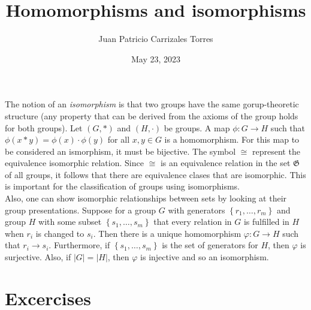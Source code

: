 \documentclass[12pt]{article}
\begin{document}
  
 \title{Homomorphisms and isomorphisms}
   \author{Juan Patricio Carrizales Torres}
     \date{May 23, 2023}
       \maketitle

       The notion of an \textit{isomorphism} is that two groups have the same gorup-theoretic structure (any property that can be derived from the axioms of the group holds for both groups). Let $(G,*)$ and $(H,\cdot)$ be groups. A map $\phi: G\to H$ such that $\phi(x*y)=\phi(x)\cdot\phi(y)$ for all $x,y\in G$ is a homomorphism. For this map to be considered an ismorphism, it must be bijective. The symbol $\cong$ represent the equivalence isomorphic relation. Since $\cong$ is an equivalence relation in the set $\mathfrak{G}$ of all groups, it follows that there are equivalence clases that are isomorphic. This is important for the classification of groups using isomorphisms.\\

       Also, one can show isomorphic relationships between sets by looking at their group presentations. Suppose for a group $G$ with generators $\left\{r_{1},\dots,r_{m} \right\}$ and group $H$ with some subset $\left\{s_{1},\dots,s_{m}  \right\}$ that every relation in $G$ is fulfilled in $H$ when $r_{i}$ is changed to $s_{i}$. Then there is a unique homomorphism $\varphi:G\to H$ such that $r_{i}\to s_{i}$. Furthermore, if $\left\{ s_{1},\dots,s_{m} \right\}$ is the set of generators for $H$, then $\varphi$ is surjective. Also, if $|G|=|H|$, then $\varphi$ is injective and so an isomorphism.
       \section{Excercises}


       
\end{document}
